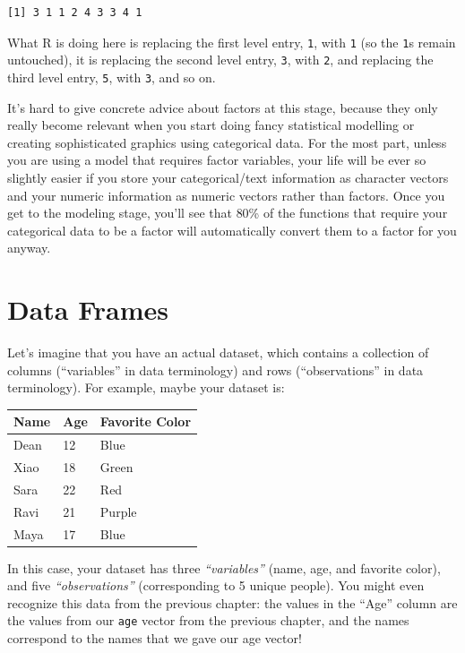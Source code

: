 \documentclass[
  letterpaper,
  DIV=11,
  numbers=noendperiod]{scrreprt}
\begin{document}
\begin{verbatim}
[1] 3 1 1 2 4 3 3 4 1
\end{verbatim}

What R is doing here is replacing the first level entry, \texttt{1},
with \texttt{1} (so the \texttt{1}s remain untouched), it is replacing
the second level entry, \texttt{3}, with \texttt{2}, and replacing the
third level entry, \texttt{5}, with \texttt{3}, and so on.

It's hard to give concrete advice about factors at this stage, because
they only really become relevant when you start doing fancy statistical
modelling or creating sophisticated graphics using categorical data. For
the most part, unless you are using a model that requires factor
variables, your life will be ever so slightly easier if you store your
categorical/text information as character vectors and your numeric
information as numeric vectors rather than factors. Once you get to the
modeling stage, you'll see that 80\% of the functions that require your
categorical data to be a factor will automatically convert them to a
factor for you anyway.

\chapter{Data Frames}\label{data-frames}

Let's imagine that you have an actual dataset, which contains a
collection of columns (``variables'' in data terminology) and rows
(``observations'' in data terminology). For example, maybe your dataset
is:

\begin{longtable}[]{@{}lll@{}}
\toprule\noalign{}
Name & Age & Favorite Color \\
\midrule\noalign{}
\endhead
\bottomrule\noalign{}
\endlastfoot
Dean & 12 & Blue \\
Xiao & 18 & Green \\
Sara & 22 & Red \\
Ravi & 21 & Purple \\
Maya & 17 & Blue \\
\end{longtable}

In this case, your dataset has three \emph{``variables''} (name, age,
and favorite color), and five \emph{``observations''} (corresponding to
5 unique people). You might even recognize this data from the previous
chapter: the values in the ``Age'' column are the values from our
\texttt{age} vector from the previous chapter, and the names correspond
to the names that we gave our age vector!
\end{document}
